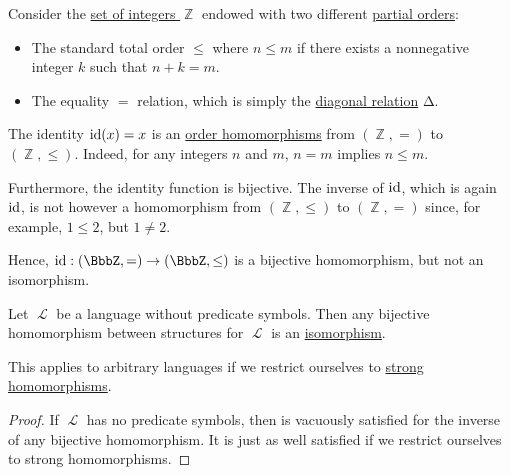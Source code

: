 \begin{example}\label{ex:bijective_order_homomorphism_not_isomorphism}
  Consider the \hyperref[def:set_of_integers]{set of integers \( \BbbZ \)} endowed with two different \hyperref[def:partially_ordered_set]{partial orders}:
  \begin{itemize}
    \item The standard total order \( \leq \) where \( n \leq m \) if there exists a nonnegative integer \( k \) such that \( n + k = m \).
    \item The equality \( = \) relation, which is simply the \hyperref[def:binary_relation/diagonal]{diagonal relation} \( \increment \).
  \end{itemize}

  The identity \( \operatorname{id}(x) = x \) is an \hyperref[def:partially_ordered_set/homomorphism]{order homomorphisms} from \( (\BbbZ, =) \) to \( (\BbbZ, \leq) \). Indeed, for any integers \( n \) and \( m \), \( n = m \) implies \( n \leq m \).

  Furthermore, the identity function is bijective. The inverse of \( \operatorname{id} \), which is again \( \operatorname{id} \), is not however a homomorphism from \( (\BbbZ, \leq) \) to \( (\BbbZ, =) \) since, for example, \( 1 \leq 2 \), but \( 1 \neq 2 \).

  Hence, \( \id: (\BbbZ, =) \to (\BbbZ, \leq) \) is a bijective homomorphism, but not an isomorphism.
\end{example}

\begin{proposition}\label{thm:automorphism_without_predicate_symbols}
  Let \( \mscrL \) be a language without predicate symbols. Then any bijective homomorphism between structures for \( \mscrL \) is an \hyperref[def:first_order_homomorphism_invertibility/isomorphism]{isomorphism}.

  This applies to arbitrary languages if we restrict ourselves to \hyperref[rem:first_order_strong_homomorphism]{strong homomorphisms}.
\end{proposition}
\begin{proof}
  If \( \mscrL \) has no predicate symbols, then  is vacuously satisfied for the inverse of any bijective homomorphism. It is just as well satisfied if we restrict ourselves to strong homomorphisms.
\end{proof}

